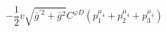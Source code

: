 %
\begin{dmath*}
%
  -  \frac{1}{2} v \sqrt{{\bar g}^{\prime 2} + {\bar g}{}^2}C^{ \varphi  D} \left(p_1^{\mu_4} + p_2^{\mu_4} + p_3^{\mu_4}\right)
%
\end{dmath*}
%
